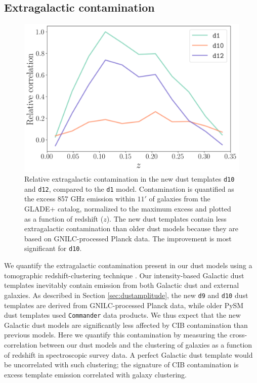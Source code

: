 \documentclass[twocolumn]{aastex631}
\begin{document}
\subsection{Extragalactic contamination} \label{sec:CIBcontamination}

\begin{figure}[ht!]
    \centering
    \includegraphics[width=\columnwidth]{figures/dust_galaxy_correlation.png}
    \caption{Relative extragalactic contamination in the new dust templates \texttt{d10} and \texttt{d12}, compared to the \texttt{d1} model. Contamination is quantified as the excess 857 GHz emission within $11'$ of galaxies from the GLADE+ catalog, normalized to the maximum excess and plotted as a function of redshift ($z$). The new dust templates contain less extragalactic contamination than older dust models because they are based on GNILC-processed Planck data. The improvement is most significant for \texttt{d10}. }
    \label{fig:extragal_contamination}
\end{figure}


We quantify the extragalactic contamination present in our dust models using a tomographic redshift-clustering technique \citep{Schmidt:2015, Chiang:2019}. Our intensity-based Galactic dust templates inevitably contain emission from both Galactic dust and external galaxies. As described in Section \ref{sec:dustamplitude}, the new \texttt{d9} and \texttt{d10} dust templates are derived from GNILC-processed Planck data, while older PySM dust templates used \texttt{Commander} data products. We thus expect that the new Galactic dust models are significantly less affected by CIB contamination than previous models. Here we quantify this contamination by measuring the cross-correlation between our dust models and the clustering of galaxies as a function of redshift in spectroscopic survey data. A perfect Galactic dust template would be uncorrelated with such clustering; the signature of CIB contamination is excess template emission correlated with galaxy clustering. 
\end{document}
